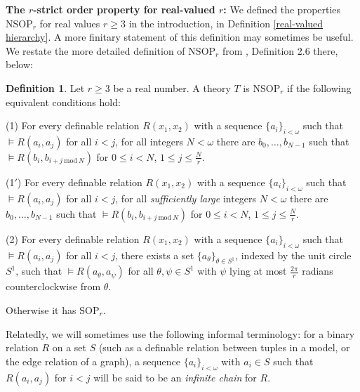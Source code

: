 \documentclass{amsart}
\theoremstyle{definition}
\newtheorem{definition}[theorem]{Definition}
\theoremstyle{remark}
\numberwithin{equation}{section}
\begin{document}
\:

\textbf{The $r$-strict order property for real-valued $r$:} We defined the properties $\mathrm{NSOP}_{r}$ for real values $r \geq 3$ in the introduction, in Definition \ref{real-valued hierarchy}. A more finitary statement of this definition may sometimes be useful. We restate the more detailed definition of $\mathrm{NSOP}_{r}$ from \cite{ApproxOrder}, Definition 2.6 there, below:

\begin{definition}\label{real-valued hierarchy, detailed definition}
    Let $r\geq 3$ be a real number. A theory $T$ is $\mathrm{NSOP}_{r}$ if the following equivalent conditions hold: 

    (1) For every definable relation $R(x_{1}, x_{2})$ with a sequence $\{a_{i}\}_{i < \omega}$ such that $\models R(a_{i}, a_{j})$ for all $i < j$, for all integers $N < \omega$ there are $b_{0}, \ldots, b_{N -1} $ such that $\models R(b_{i}, b_{i+j \mathrm{\: mod \:} N})$ for $0 \leq i <N$, $1 \leq j \leq \frac{N}{r}$.

    (1$'$) For every definable relation $R(x_{1}, x_{2})$ with a sequence $\{a_{i}\}_{i < \omega}$ such that $\models R(a_{i}, a_{j})$ for all $i < j$, for all \textit{sufficiently large} integers $N < \omega$ there are $b_{0}, \ldots, b_{N -1} $ such that $\models R(b_{i}, b_{i+j \mathrm{\: mod \:} N})$ for $0 \leq i <N$, $1 \leq j \leq \frac{N}{r}$.

    (2) For every definable relation $R(x_{1}, x_{2})$ with a sequence $\{a_{i}\}_{i < \omega}$ such that $\models R(a_{i}, a_{j})$ for all $i < j$, there exists a set $\{a_{\theta}\}_{\theta \in S^{1}}$, indexed by the unit circle $S^{1}$, such that $\models R(a_{\theta}, a_{\psi})$ for all $\theta, \psi \in S^{1}$ with $\psi$ lying at most $\frac{2\pi}{r}$ radians counterclockwise from $\theta$.

 Otherwise it has $\mathrm{SOP}_{r}$.
\end{definition}

Relatedly, we will sometimes use the following informal terminology: for a binary relation $R$ on a set $S$ (such as a definable relation between tuples in a model, or the edge relation of a graph), a sequence $\{a_{i}\}_{i < \omega}$ with $a_{i} \in S$ such that $ R(a_{i}, a_{j})$ for $i < j$ will be said to be an \textit{infinite chain} for $R$.
\end{document}
